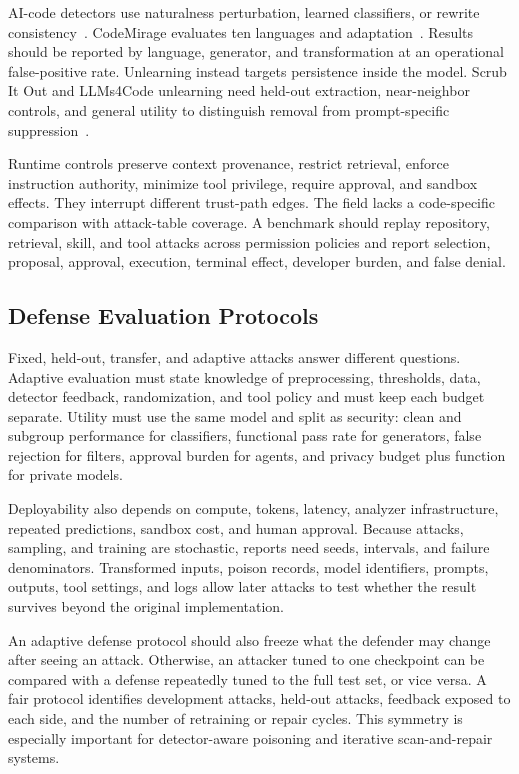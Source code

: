 \documentclass[acmsmall,screen,review]{acmart}
\begin{document}
AI-code detectors use naturalness perturbation, learned classifiers, or rewrite consistency~\cite{shi2025betweenlines,nguyen2024gptsniffer,ye2025uncovering}. CodeMirage evaluates ten languages and adaptation~\cite{guo2025codemirage}. Results should be reported by language, generator, and transformation at an operational false-positive rate. Unlearning instead targets persistence inside the model. Scrub It Out and LLMs4Code unlearning need held-out extraction, near-neighbor controls, and general utility to distinguish removal from prompt-specific suppression~\cite{chu2026scrubitout,gu2026unlearning}.

Runtime controls preserve context provenance, restrict retrieval, enforce instruction authority, minimize tool privilege, require approval, and sandbox effects. They interrupt different trust-path edges. The field lacks a code-specific comparison with attack-table coverage. A benchmark should replay repository, retrieval, skill, and tool attacks across permission policies and report selection, proposal, approval, execution, terminal effect, developer burden, and false denial.

\subsection{Defense Evaluation Protocols}
Fixed, held-out, transfer, and adaptive attacks answer different questions. Adaptive evaluation must state knowledge of preprocessing, thresholds, data, detector feedback, randomization, and tool policy and must keep each budget separate. Utility must use the same model and split as security: clean and subgroup performance for classifiers, functional pass rate for generators, false rejection for filters, approval burden for agents, and privacy budget plus function for private models.

Deployability also depends on compute, tokens, latency, analyzer infrastructure, repeated predictions, sandbox cost, and human approval. Because attacks, sampling, and training are stochastic, reports need seeds, intervals, and failure denominators. Transformed inputs, poison records, model identifiers, prompts, outputs, tool settings, and logs allow later attacks to test whether the result survives beyond the original implementation.

An adaptive defense protocol should also freeze what the defender may change after seeing an attack. Otherwise, an attacker tuned to one checkpoint can be compared with a defense repeatedly tuned to the full test set, or vice versa. A fair protocol identifies development attacks, held-out attacks, feedback exposed to each side, and the number of retraining or repair cycles. This symmetry is especially important for detector-aware poisoning and iterative scan-and-repair systems.
\end{document}
